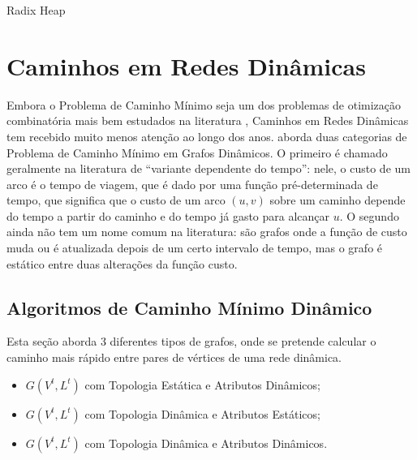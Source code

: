 \begin{algorithm}[h!]
\caption{Radix Heap}
\label{codeRadix}
\end{algorithm}
\FloatBarrier

\section{Caminhos em Redes Dinâmicas}
\label{sec:pathdyn}
Embora o Problema de Caminho Mínimo seja um dos problemas de otimização combinatória mais bem estudados
na literatura \cite{bookahuja}, Caminhos em Redes Dinâmicas tem recebido muito menos atenção ao longo dos anos.
\cite{giacomo} aborda duas categorias de Problema de Caminho Mínimo em Grafos Dinâmicos. O primeiro é chamado
geralmente na literatura de ``variante dependente do tempo'': nele, o custo de um arco é o tempo de viagem, que é dado
por uma função pré-determinada de tempo, que significa que o custo de um arco $(u, v)$ sobre um caminho
depende do tempo a partir do caminho e do tempo já gasto para alcançar $u$.
O segundo ainda não tem um nome comum na literatura: são grafos onde a função de custo muda ou é atualizada
depois de um certo intervalo de tempo, mas o grafo é estático entre duas alterações da função custo.

\subsection{Algoritmos de Caminho Mínimo Dinâmico}
Esta seção aborda 3 diferentes tipos de grafos, onde se pretende calcular o caminho mais rápido entre pares de vértices
de uma rede dinâmica.
\begin{itemize}
\item $G(V^t, L^t)$ com Topologia Estática e Atributos Dinâmicos;
\item $G(V^t, L^t)$ com Topologia Dinâmica e Atributos Estáticos;
\item $G(V^t, L^t)$ com Topologia Dinâmica e Atributos Dinâmicos.
\end{itemize}

